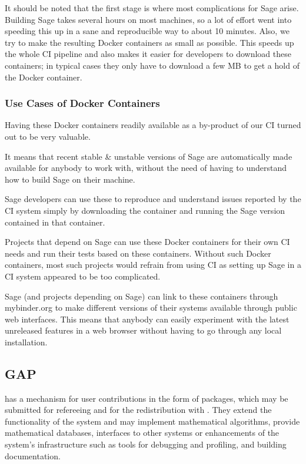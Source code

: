 \documentclass{deliverablereport}
\begin{document}
It should be noted that the first stage is where most complications for Sage
arise. Building Sage takes several hours on most machines, so a lot of effort
went into speeding this up in a sane and reproducible way to about 10 minutes.
Also, we try to make the resulting Docker containers as small as possible. This
speeds up the whole CI pipeline and also makes it easier for developers to
download these containers; in typical cases they only have to download a few MB
to get a hold of the Docker container.

\subsubsection{Use Cases of Docker Containers}
Having these Docker containers readily available as a by-product of our CI turned out to be very valuable.

It means that recent stable \& unstable versions of Sage are automatically made
available for anybody to work with, without the need of having to understand
how to build Sage on their machine.

Sage developers can use these to reproduce and understand issues
reported by the CI system simply by downloading the container and running the
Sage version contained in that container.

Projects that depend on Sage can use these Docker containers for their own CI
needs and run their tests based on these containers. Without such Docker
containers, most such projects would refrain from using CI as setting up Sage
in a CI system appeared to be too complicated.

Sage (and projects depending on Sage) can link to these containers through
mybinder.org  to make
different versions of their systems available through public web interfaces.
This means that anybody can easily experiment with the latest unreleased
features in a web browser without having to go through any local installation.

\subsection{GAP}

\GAP has a mechanism for user contributions in the form of packages,
which may be submitted for refereeing and for the redistribution with \GAP.
They extend the functionality of the system and may implement mathematical
algorithms, provide mathematical databases, interfaces to other systems or
enhancements of the system's infrastructure such as tools for debugging
and profiling, and building documentation. 
\end{document}
